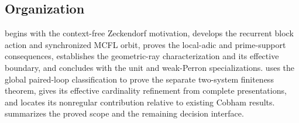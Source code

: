 \subsection{Organization}

 begins with the context-free Zeckendorf
motivation, develops the recurrent block action and synchronized MCFL orbit,
proves the local-adic and prime-support consequences, establishes the
geometric-ray characterization and its effective boundary, and concludes
with the unit and weak-Perron specializations. 
uses the global paired-loop classification to prove the separate two-system
finiteness theorem, gives its effective cardinality refinement from complete
presentations, and locates its nonregular contribution relative to existing
Cobham results.  summarizes the proved scope and the
remaining decision interface.
